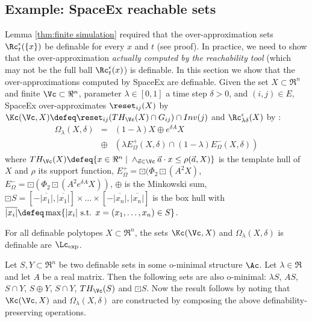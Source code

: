 \subsection{Example: SpaceEx reachable sets}
\label{sec:spaceex}
Lemma \ref{thm:finite simulation} required that the over-approximation sets $\Rc^\epsilon_{t}(\{{x}\})$ be definable for every $x$ and $t$ (see proof).
In practice, we need to show that the over-approximation \emph{actually computed by the reachability tool} (which may not be the full ball $\Rc^\epsilon_{t}(x)$) is definable.
In this section we show that the over-approximations computed by SpaceEx \cite{FrehseCAV11} are definable.
Given the set $X\subset \Re^n$ and finite $\Vc \subset \Re^n$, parameter $\lambda \in [0,1]$ a time step $\delta>0$, and $(i,j) \in E$, 
SpaceEx over-approximates $\reset_{ij}(X)$ by $\Kc(\Vc,X) \defeq \reset_{ij}(TH_\Vc(X)\cap G_{ij})\cap Inv(j)$ and $\Rc_{\lambda \delta}^\epsilon(X)$ by \cite{FrehseCAV11}:
\begin{eqnarray}
\Omega_\lambda(X,\delta) &=& (1-\lambda)X \oplus e^{\delta A} X 
\nonumber \\
&\oplus&(\lambda E_\Omega^+(X,\delta) \cap (1-\lambda) E_\Omega^-(X,\delta))
\end{eqnarray}
where
$TH_\Vc(X) \defeq \{x\in\Re^n \;|\;\land_{\vec{a} \in \Vc} \vec{a}\cdot x \leq \rho(\vec{a},X)\}$ is the template hull of $X$ and $\rho$ its support function,
$E_\Omega^+ = \boxdot (\Phi_2 \boxdot(A^2 X)$,
$E_\Omega^- = \boxdot (\Phi_2 \boxdot(A^2 e^{\delta A}X))$,
$\oplus$ is the Minkowski sum,
$\boxdot S =  [-\overline{|x_1|}, \overline{|x_1|} ] \times \ldots \times [-\overline{|x_n|}, \overline{|x_n|} ]$ is the box hull
with $\overline{|x_i|} \defeq \max\{|x_i| \text{ s.t. } x=(x_1,\ldots,x_n) \in S\}$.

\begin{thm}
	\label{thm:spaceex definable}
	For all definable polytopes $X \subset \Re^n$, the sets $\Kc(\Vc,X)$ and $\Omega_\lambda(X,\delta)$ is definable are $\Lc_{\exp}$.
\end{thm}
	
\begin{prf}
Let $S, Y \subset \Re^n$ be two definable sets in some o-minimal structure $\Ac$.
Let $\lambda \in \Re$ and let $A$ be a real matrix.
Then the following sets are also o-minimal: $\lambda S$, $A S$, $S \cap Y$, $S \oplus Y$, $S \cap Y$, $TH_\Vc(S)$ and $\boxdot S$.
Now the result follows by noting that $\Kc(\Vc,X)$ and $\Omega_\lambda(X,\delta)$ are constructed by composing the above definability-preserving operations.
\end{prf}

